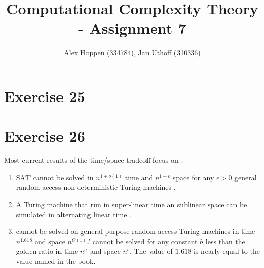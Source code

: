 \documentclass[10pt]{article}
\title{Computational Complexity Theory - Assignment 7}
\author{Alex Hoppen (334784), Jan Uthoff (310336)}
\newcommand{\SAT}{\text{SAT}}
\begin{document}
\maketitle

\section*{Exercise 25}
  

\section*{Exercise 26}
Most current results of the time/space tradeoff focus on \SAT.
  \begin{enumerate}
    \item $\overline{\SAT}$ cannot be solved in $n^{1+o(1)}$ time and
    $n^{1-\epsilon}$ space for any $\epsilon > 0$ general random-access
    non-deterministic Turing machines \cite{CaSS}.
    \item A Turing machine that run in super-linear time an sublinear space can
    be simulated in alternating linear time \cite{CaSS}.
    \item \SAT cannot be solved on general purpose random-access Turing
    machines in time $n^{1.618}$ and space $n^{O(1)}$.' \SAT cannot be solved
    for any constant $b$ less than the golden ratio in time $n^{a}$ and space
    $n^{b}$\cite{CC}. The value of $1.618$ is nearly equal to the value named
    in the book.
  \end{enumerate}
\end{document}
